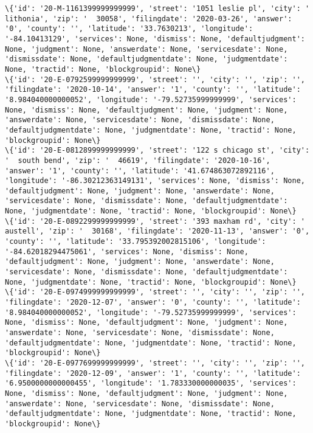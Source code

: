 \documentclass[11pt]{article}
\begin{document}
\begin{Verbatim}[commandchars=\\\{\}]
\{'id': '20-M-1161399999999999', 'street': '1051 leslie pl', 'city': '  lithonia', 'zip': '  30058', 'filingdate': '2020-03-26', 'answer': '0', 'county': '', 'latitude': '33.7630213', 'longitude': '-84.10413129', 'services': None, 'dismiss': None, 'defaultjudgment': None, 'judgment': None, 'answerdate': None, 'servicesdate': None, 'dismissdate': None, 'defaultjudgmentdate': None, 'judgmentdate': None, 'tractid': None, 'blockgroupid': None\}
\{'id': '20-E-0792599999999999', 'street': '', 'city': '', 'zip': '', 'filingdate': '2020-10-14', 'answer': '1', 'county': '', 'latitude': '8.984040000000052', 'longitude': '-79.52735999999999', 'services': None, 'dismiss': None, 'defaultjudgment': None, 'judgment': None, 'answerdate': None, 'servicesdate': None, 'dismissdate': None, 'defaultjudgmentdate': None, 'judgmentdate': None, 'tractid': None, 'blockgroupid': None\}
\{'id': '20-E-0812899999999999', 'street': '122 s chicago st', 'city': '  south bend', 'zip': '  46619', 'filingdate': '2020-10-16', 'answer': '1', 'county': '', 'latitude': '41.674863072892116', 'longitude': '-86.30212363149131', 'services': None, 'dismiss': None, 'defaultjudgment': None, 'judgment': None, 'answerdate': None, 'servicesdate': None, 'dismissdate': None, 'defaultjudgmentdate': None, 'judgmentdate': None, 'tractid': None, 'blockgroupid': None\}
\{'id': '20-E-0892299999999999', 'street': '393 maxham rd', 'city': '  austell', 'zip': '  30168', 'filingdate': '2020-11-13', 'answer': '0', 'county': '', 'latitude': '33.795392002815106', 'longitude': '-84.62018294475061', 'services': None, 'dismiss': None, 'defaultjudgment': None, 'judgment': None, 'answerdate': None, 'servicesdate': None, 'dismissdate': None, 'defaultjudgmentdate': None, 'judgmentdate': None, 'tractid': None, 'blockgroupid': None\}
\{'id': '20-E-0974999999999999', 'street': '', 'city': '', 'zip': '', 'filingdate': '2020-12-07', 'answer': '0', 'county': '', 'latitude': '8.984040000000052', 'longitude': '-79.52735999999999', 'services': None, 'dismiss': None, 'defaultjudgment': None, 'judgment': None, 'answerdate': None, 'servicesdate': None, 'dismissdate': None, 'defaultjudgmentdate': None, 'judgmentdate': None, 'tractid': None, 'blockgroupid': None\}
\{'id': '20-E-0977699999999999', 'street': '', 'city': '', 'zip': '', 'filingdate': '2020-12-09', 'answer': '1', 'county': '', 'latitude': '6.9500000000000455', 'longitude': '1.783330000000035', 'services': None, 'dismiss': None, 'defaultjudgment': None, 'judgment': None, 'answerdate': None, 'servicesdate': None, 'dismissdate': None, 'defaultjudgmentdate': None, 'judgmentdate': None, 'tractid': None, 'blockgroupid': None\}

\end{Verbatim}
\end{document}
